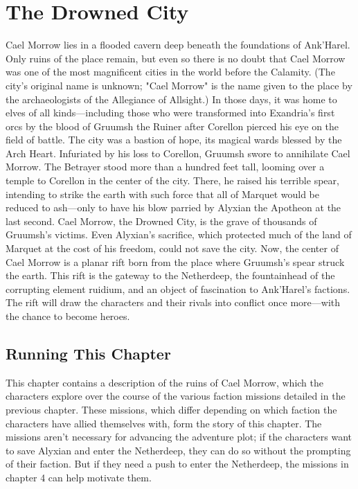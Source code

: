 \documentclass[10pt,a4,twoside,twocolumn,openany,nodeprecatedcode]{dndbook}
\begin{document}
\chapter{The Drowned City}
Cael Morrow lies in a flooded cavern deep beneath the foundations of Ank'Harel. Only ruins of the place remain, but even so there is no doubt that Cael Morrow was one of the most magnificent cities in the world before the Calamity. (The city's original name is unknown; "Cael Morrow" is the name given to the place by the archaeologists of the Allegiance of Allsight.) In those days, it was home to elves of all kinds—including those who were transformed into Exandria's first orcs by the blood of Gruumsh the Ruiner after Corellon pierced his eye on the field of battle. The city was a bastion of hope, its magical wards blessed by the Arch Heart.
Infuriated by his loss to Corellon, Gruumsh swore to annihilate Cael Morrow. The Betrayer stood more than a hundred feet tall, looming over a temple to Corellon in the center of the city. There, he raised his terrible spear, intending to strike the earth with such force that all of Marquet would be reduced to ash—only to have his blow parried by Alyxian the Apotheon at the last second.
Cael Morrow, the Drowned City, is the grave of thousands of Gruumsh's victims. Even Alyxian's sacrifice, which protected much of the land of Marquet at the cost of his freedom, could not save the city. Now, the center of Cael Morrow is a planar rift born from the place where Gruumsh's spear struck the earth. This rift is the gateway to the Netherdeep, the fountainhead of the corrupting element ruidium, and an object of fascination to Ank'Harel's factions. The rift will draw the characters and their rivals into conflict once more—with the chance to become heroes.
\section{Running This Chapter}
This chapter contains a description of the ruins of Cael Morrow, which the characters explore over the course of the various faction missions detailed in the previous chapter. These missions, which differ depending on which faction the characters have allied themselves with, form the story of this chapter. The missions aren't necessary for advancing the adventure plot; if the characters want to save Alyxian and enter the Netherdeep, they can do so without the prompting of their faction. But if they need a push to enter the Netherdeep, the missions in chapter 4 can help motivate them.
\end{document}
